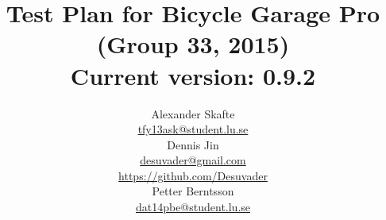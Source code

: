 \title{
	Test Plan for Bicycle Garage Pro\\
	(Group 33, 2015)\\
	\vspace{0.2in}
	\normalsize Current version: 0.9.2
}
\author{
	Alexander Skafte\\
	\url{tfy13ask@student.lu.se}\\
	Dennis Jin\\
	\url{desuvader@gmail.com}\\
	\url{https://github.com/Desuvader}\\
	Petter Berntsson\\
	\url{dat14pbe@student.lu.se}
}
\date{}
